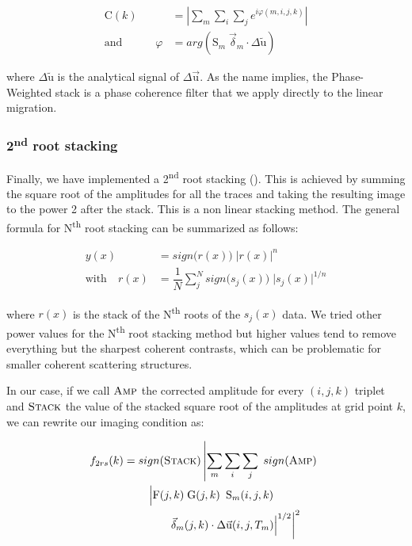 \documentclass[9pt,a4paper]{article}
\numberwithin{equation}{section}
\begin{document}
\begin{multicols}{2}
\begin{align}
  \text{C}(k) &= \left\vert \sum_m \sum_i \sum_j e^{i\varphi(m,i,j,k)} \right\vert
  \label{coh}
\\
  \text{and} \quad \qquad \varphi &= arg( \text{S}_m \; \vec{\delta}_m \cdot \Delta\tilde{\text{u}})
  \label{arg}
\end{align}
\vspace{1mm}

\noindent where $\Delta\tilde{\text{u}}$ is the analytical signal of $\Delta\vec{\text{u}}$.
As the name implies, the Phase-Weighted stack is a phase coherence filter that we apply directly to the linear migration.

\subsubsection{2\textsuperscript{nd} root stacking}

Finally, we have implemented a 2\textsuperscript{nd} root stacking (\cite{schi_gji_97}).
This is achieved by summing the square root of the amplitudes for all the traces and taking the resulting image to the power 2 after the stack.
This is a non linear stacking method.
The general formula for N\textsuperscript{th} root stacking can be summarized as follows:

\begin{align}
  y(x) &= sign\big(r(x)\big) \; \vert r(x) \vert^{n}
  \label{2nd_1}
\\
  \text{with} \quad r(x) &= \dfrac{1}{N} \sum_j^N sign\big(s_j(x)\big) \; \vert s_j(x) \vert^{1/n}
  \label{2nd_2}
\end{align}
\vspace{1mm}

\noindent where $r(x)$ is the stack of the N\textsuperscript{th} roots of the $s_j(x)$ data.
We tried other power values for the N\textsuperscript{th} root stacking method but higher values tend to remove everything but the sharpest coherent contrasts, which can be problematic for smaller coherent scattering structures.

In our case, if we call $\textsc{Amp}$ the corrected amplitude for every $(i,j,k)$ triplet and $\textsc{Stack}$ the value of the stacked square root of the amplitudes at grid point $k$, we can rewrite our imaging condition as:

\begin{align}
  f_{2rs}(k) &= sign(\textsc{Stack}) \left\vert \sum_m \sum_i \sum_j \; sign(\textsc{Amp}) \; \right.\notag\\&\qquad\left. \Big\vert \text{F}(j,k) \; \text{G}(j,k) \tfrac{}{}\; \text{S}_{m}(i,j,k) \; \right.\notag\\&\qquad\qquad\left. \vec{\delta}_{m}(j,k) \cdot \Delta\vec{\text{u}}(i,j,T_m)\Big\vert^{1/2} \right\vert ^2
  \label{2rs}
\end{align}
\vspace{1mm}


\end{multicols}
\end{document}
